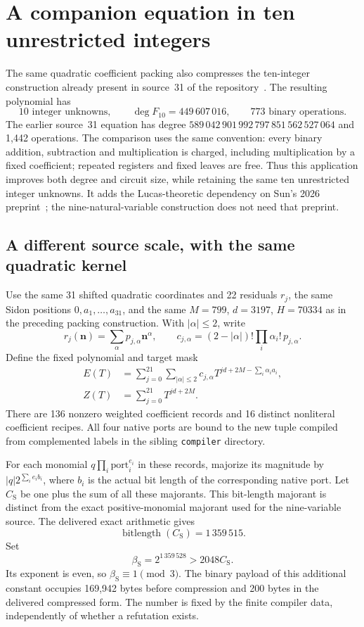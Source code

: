 \section{A companion equation in ten unrestricted integers}
\label{sec:sun-companion}

The same quadratic coefficient packing also compresses the ten-integer
construction already present in source~31 of the repository~\cite{repo}.
The resulting polynomial has
\[
 \boxed{10\text{ integer unknowns},\qquad
 \deg F_{10}=449\,607\,016,\qquad 773\text{ binary operations}.}
\]
The earlier source~31 equation has degree
$589\,042\,901\,992\,797\,851\,562\,527\,064$ and 1,442 operations.
The comparison uses the same convention: every binary addition,
subtraction and multiplication is charged, including multiplication by
a fixed coefficient; repeated registers and fixed leaves are free.
Thus this application improves both degree and circuit size, while
retaining the same ten unrestricted integer unknowns.  It adds the
Lucas-theoretic dependency on Sun's 2026 preprint~\cite{sun2026}; the
nine-natural-variable construction does not need that preprint.

\subsection{A different source scale, with the same quadratic kernel}

Use the same 31 shifted quadratic coordinates and 22 residuals $r_j$,
the same Sidon positions $0,a_1,\ldots,a_{31}$, and the same
$M=799$, $d=3197$, $H=70334$ as in the preceding packing construction.
With $|\alpha|\le2$, write
\[
 r_j(\mathbf n)=\sum_\alpha p_{j,\alpha}\mathbf n^\alpha,
 \qquad c_{j,\alpha}=(2-|\alpha|)!\prod_i\alpha_i!\,p_{j,\alpha}.
\]
Define the fixed polynomial and target mask
\begin{align*}
 E(T)&=\sum_{j=0}^{21}\sum_{|\alpha|\le2}
 c_{j,\alpha}T^{jd+2M-\sum_i\alpha_i a_i},\\
 Z(T)&=\sum_{j=0}^{21}T^{jd+2M}.
\end{align*}
There are 136 nonzero weighted coefficient records and 16 distinct
nonliteral coefficient recipes. All four native ports are bound to the
new tuple compiled from complemented labels in the sibling \texttt{compiler} directory.

For each monomial $q\prod_i\mathrm{port}_i^{e_i}$ in these records,
majorize its magnitude by $|q|2^{\sum_i e_i b_i}$, where $b_i$ is the
actual bit length of the corresponding native port. Let $C_{\mathrm S}$ be one
plus the sum of all these majorants. This bit-length majorant is distinct
from the exact positive-monomial majorant used for the nine-variable source. The delivered exact arithmetic gives
\[
 \operatorname{bitlength}(C_{\mathrm S})=1\,359\,515.
\]
Set
\[
 \beta_{\mathrm S}=2^{1\,359\,528}>2048C_{\mathrm S}.
\]
Its exponent is even, so $\beta_{\mathrm S}\equiv1\pmod3$.
The binary payload of this additional constant occupies 169,942 bytes
before compression and 200 bytes in the delivered compressed form.
The number is fixed by the finite compiler data, independently of
whether a refutation exists.

